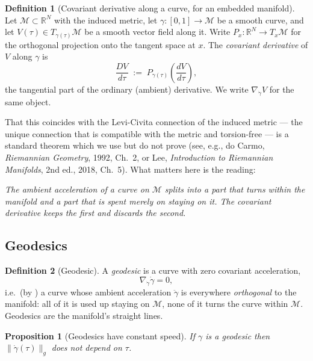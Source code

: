 \documentclass[11pt,a4paper]{report}
\newtheorem{proposition}[proposition]{Proposition}
\theoremstyle{definition}
\newtheorem{definition}[definition]{Definition}
\theoremstyle{remark}
\newcommand{\RR}{\mathbb R}
\begin{document}
\begin{definition}[Covariant derivative along a curve, for an embedded manifold]
\label{def:covariant-derivative}
Let $\mathcal M\subset\RR^N$ with the induced metric, let
$\gamma:[0,1]\to\mathcal M$ be a smooth curve, and let $V(\tau)\in T_{\gamma(\tau)}\mathcal M$
be a smooth vector field along it. Write
$P_x:\RR^N\to T_x\mathcal M$ for the orthogonal projection onto the tangent
space at $x$. The \emph{covariant derivative} of $V$ along $\gamma$ is
\[
\frac{DV}{d\tau}
\;:=\;
P_{\gamma(\tau)}\!\left(\frac{dV}{d\tau}\right) ,
\]
the tangential part of the ordinary (ambient) derivative. We write
$\nabla_{\dot\gamma}V$ for the same object.
\end{definition}

That this coincides with the Levi-Civita connection of the induced metric
--- the unique connection that is compatible with the metric and
torsion-free --- is a standard theorem which we use but do not prove (see,
e.g., do Carmo, \emph{Riemannian Geometry}, 1992, Ch.~2, or Lee,
\emph{Introduction to Riemannian Manifolds}, 2nd ed., 2018, Ch.~5). What
matters here is the reading:

\begin{center}
\emph{The ambient acceleration of a curve on $\mathcal M$ splits into a part
that turns within the manifold and a part that is spent merely on staying
on it. The covariant derivative keeps the first and discards the second.}
\end{center}

\subsection{Geodesics}

\begin{definition}[Geodesic]
\label{def:geodesic-scratch}
A \emph{geodesic} is a curve with zero covariant acceleration,
\[
\nabla_{\dot\gamma}\dot\gamma=0 ,
\]
i.e.\ (by ) a curve whose ambient
acceleration $\ddot\gamma$ is everywhere \emph{orthogonal} to the manifold:
all of it is used up staying on $\mathcal M$, none of it turns the curve
within $\mathcal M$. Geodesics are the manifold's straight lines.
\end{definition}

\begin{proposition}[Geodesics have constant speed]
\label{prop:geodesic-constant-speed}
If $\gamma$ is a geodesic then $\|\dot\gamma(\tau)\|_g$ does not depend on
$\tau$.
\end{proposition}
\end{document}
